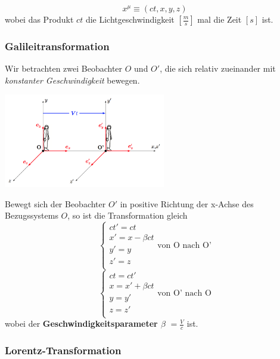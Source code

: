 \documentclass[7pt]{article}
\begin{document}
\begin{multicols*}{3}
\begin{equation*}
	x^\mu \equiv (ct, x, y, z)
\end{equation*}
wobei das Produkt $ct$ die Lichtgeschwindigkeit $[\frac{m}{s}]$ mal die Zeit $[s]$ ist.

\subsubsection{Galileitransformation}

Wir betrachten zwei Beobachter $O$ und $O'$, die sich relativ zueinander mit \emph{konstanter Geschwindigkeit} bewegen.

\begin{center}
	\includegraphics[width=200pt]{images/galileitransformation}
\end{center}

Bewegt sich der Beobachter $O'$ in positive Richtung der x-Achse des Bezugssystems $O$, so ist die Transformation gleich
\begin{equation*}
	\left\{
		\begin{array}{ll}
			ct' = ct \\
        	x' = x - \beta ct\\
            y' = y \\
            z' = z \\
		\end{array}
	\right.
	\text{von O nach O'}
\end{equation*}
\begin{equation*}
	\left\{
		\begin{array}{ll}
			ct = ct' \\
        	x = x' + \beta ct\\
            y = y' \\
            z = z' \\
		\end{array}
	\right.
	\text{von O' nach O}
\end{equation*}
wobei der \textbf{Geschwindigkeitsparameter $\beta$} $= \frac{V}{c}$ ist. 

\subsubsection{Lorentz-Transformation}


\end{multicols*}
\end{document}
